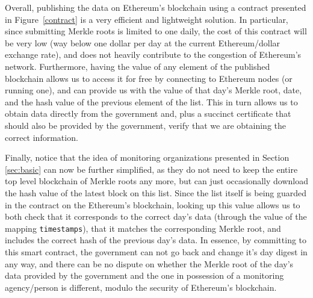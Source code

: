 Overall, publishing the data on Ethereum's blockchain using a contract presented in Figure~\ref{contract} is a very efficient and lightweight solution. In particular, since submitting Merkle roots is limited to one daily, the cost of this contract will be very low (way below one dollar per day at the current Ethereum/dollar exchange rate), and does not heavily contribute to the congestion of Ethereum's network. Furthermore, having the value of any element of the published blockchain allows us to access it for free by connecting to Ethereum nodes (or running one), and can provide us with the value of that day's Merkle root, date, and the hash value of the previous element of the list. This in turn allows us to obtain data directly from the government and, plus a succinct certificate that should also be provided by the government, verify that we are obtaining the correct information.

Finally, notice that the idea of monitoring organizations presented in Section \ref{sec:basic} can now be further simplified, as they do not need to keep the entire top level blockchain of Merkle roots any more, but can just occasionally download the hash value of the latest block on this list. Since the list itself is being guarded in the contract on the Ethereum's blockchain, looking up this value allows us to both check that it corresponds to the correct day's data (through the value of the mapping \texttt{timestamps}), that it matches the corresponding Merkle root, and includes the correct hash of the previous day's data. In essence, by committing to this smart contract, the government can not go back and change it's day digest in any way, and there can be no dispute on whether the Merkle root of the day's data provided by the government and the one in possession of a monitoring agency/person is different, modulo the security of Ethereum's blockchain.

